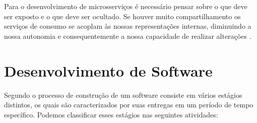 Para o desenvolvimento de microsserviços é necessário pensar sobre o que deve ser
exposto e o que deve ser ocultado. Se houver muito compartilhamento os serviços de
consumo se acoplam às nossas representações internas, diminuindo a nossa autonomia
e consequentemente a nossa capacidade de realizar alterações \cite{Newman2015}.


\section{Desenvolvimento de Software}

Segundo  o processo de construção de um software consiste
em vários estágios distintos, os quais são caracterizados por suas entregas em um
período de tempo específico. Podemos classificar esses estágios nas seguintes
atividades:

